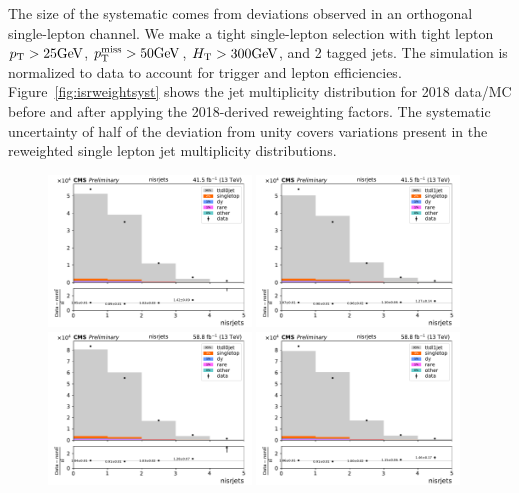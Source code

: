 The size of the systematic comes from deviations observed in an orthogonal
single-lepton channel. We make a tight single-lepton selection with tight
lepton $p_{\mathrm{T}}>25\text{GeV}$, $p_{\mathrm{T}}^\text{miss}>50\text{GeV}$, $H_{\mathrm{T}}>300\text{GeV}$, and 2 \PQb tagged jets. 
The simulation is normalized to data to account for trigger and lepton efficiencies.
Figure~\ref{fig:isrweightsyst} shows the jet multiplicity distribution for 2018 data/MC before and after
applying the 2018-derived reweighting factors. The systematic uncertainty of half of the deviation from unity covers
variations present in the reweighted single lepton jet multiplicity distributions.

  \begin{figure}[h!]
  \centering
  \includegraphics[width=0.48\textwidth]{figs/ftan/isr/y2017_isrrw_nisrjets0.pdf}
  \includegraphics[width=0.48\textwidth]{figs/ftan/isr/y2017_isrrw_nisrjets1.pdf} \\
  \includegraphics[width=0.48\textwidth]{figs/ftan/isr/y2018_isrrw_nisrjets0.pdf}
  \includegraphics[width=0.48\textwidth]{figs/ftan/isr/y2018_isrrw_nisrjets1.pdf}

\end{figure}
